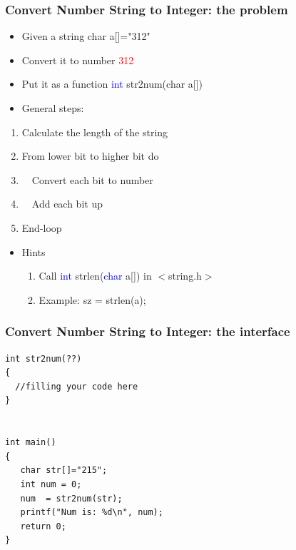 \begin{frame}
\frametitle{Convert Number String to Integer: the problem}
\begin{itemize}
	\item {Given a string char a[]="312"}
	\item {Convert it to number \textcolor{red}{312}}
	\item {Put it as a function \textcolor{blue}{int} str2num(char a[])}
	\item {General steps:}
\end{itemize}
\begin{enumerate}
	\item {Calculate the length of the string}
	\item {From lower bit to higher bit do}
	\item {~~Convert each bit to number}
	\item {~~Add each bit up}
	\item {End-loop}
\end{enumerate}
\begin{itemize}
	\item {Hints}
	\begin{enumerate}
		\item {Call \textcolor{blue}{int} strlen(\textcolor{blue}{char} a[]) in $<$string.h$>$}
		\item {Example: sz = strlen(a);}
	\end{enumerate}
\end{itemize}
\end{frame}

\begin{frame}[fragile]
\frametitle{Convert Number String to Integer: the interface}

\begin{lstlisting}[linewidth=0.8\linewidth, xleftmargin=0.1\linewidth]
int str2num(??)
{
  //filling your code here
}


int main()
{
   char str[]="215";
   int num = 0;
   num  = str2num(str);
   printf("Num is: %d\n", num);
   return 0;
}
\end{lstlisting}
\end{frame}

